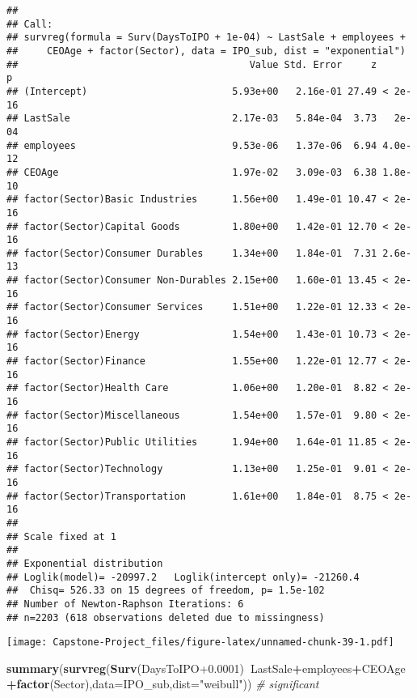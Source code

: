 \documentclass[]{article}
\newenvironment{Shaded}{\begin{snugshade}}{\end{snugshade}}
\newcommand{\CommentTok}[1]{\textcolor[rgb]{0.56,0.35,0.01}{\textit{#1}}}
\newcommand{\DataTypeTok}[1]{\textcolor[rgb]{0.13,0.29,0.53}{#1}}
\newcommand{\FloatTok}[1]{\textcolor[rgb]{0.00,0.00,0.81}{#1}}
\newcommand{\KeywordTok}[1]{\textcolor[rgb]{0.13,0.29,0.53}{\textbf{#1}}}
\newcommand{\NormalTok}[1]{#1}
\newcommand{\OperatorTok}[1]{\textcolor[rgb]{0.81,0.36,0.00}{\textbf{#1}}}
\newcommand{\StringTok}[1]{\textcolor[rgb]{0.31,0.60,0.02}{#1}}
\begin{document}
\begin{verbatim}
## 
## Call:
## survreg(formula = Surv(DaysToIPO + 1e-04) ~ LastSale + employees + 
##     CEOAge + factor(Sector), data = IPO_sub, dist = "exponential")
##                                        Value Std. Error     z       p
## (Intercept)                         5.93e+00   2.16e-01 27.49 < 2e-16
## LastSale                            2.17e-03   5.84e-04  3.73   2e-04
## employees                           9.53e-06   1.37e-06  6.94 4.0e-12
## CEOAge                              1.97e-02   3.09e-03  6.38 1.8e-10
## factor(Sector)Basic Industries      1.56e+00   1.49e-01 10.47 < 2e-16
## factor(Sector)Capital Goods         1.80e+00   1.42e-01 12.70 < 2e-16
## factor(Sector)Consumer Durables     1.34e+00   1.84e-01  7.31 2.6e-13
## factor(Sector)Consumer Non-Durables 2.15e+00   1.60e-01 13.45 < 2e-16
## factor(Sector)Consumer Services     1.51e+00   1.22e-01 12.33 < 2e-16
## factor(Sector)Energy                1.54e+00   1.43e-01 10.73 < 2e-16
## factor(Sector)Finance               1.55e+00   1.22e-01 12.77 < 2e-16
## factor(Sector)Health Care           1.06e+00   1.20e-01  8.82 < 2e-16
## factor(Sector)Miscellaneous         1.54e+00   1.57e-01  9.80 < 2e-16
## factor(Sector)Public Utilities      1.94e+00   1.64e-01 11.85 < 2e-16
## factor(Sector)Technology            1.13e+00   1.25e-01  9.01 < 2e-16
## factor(Sector)Transportation        1.61e+00   1.84e-01  8.75 < 2e-16
## 
## Scale fixed at 1 
## 
## Exponential distribution
## Loglik(model)= -20997.2   Loglik(intercept only)= -21260.4
##  Chisq= 526.33 on 15 degrees of freedom, p= 1.5e-102 
## Number of Newton-Raphson Iterations: 6 
## n=2203 (618 observations deleted due to missingness)
\end{verbatim}

\texttt{[image: Capstone-Project\_files/figure-latex/unnamed-chunk-39-1.pdf]}

\begin{Shaded}
\begin{Highlighting}[]
\KeywordTok{summary}\NormalTok{(}\KeywordTok{survreg}\NormalTok{(}\KeywordTok{Surv}\NormalTok{(DaysToIPO}\FloatTok{+0.0001}\NormalTok{)}\OperatorTok{~}\NormalTok{LastSale}\OperatorTok{+}\NormalTok{employees}\OperatorTok{+}\NormalTok{CEOAge}\OperatorTok{+}\KeywordTok{factor}\NormalTok{(Sector),}\DataTypeTok{data=}\NormalTok{IPO_sub,}\DataTypeTok{dist=}\StringTok{"weibull"}\NormalTok{)) }\CommentTok{# significant}
\end{Highlighting}
\end{Shaded}
\end{document}
